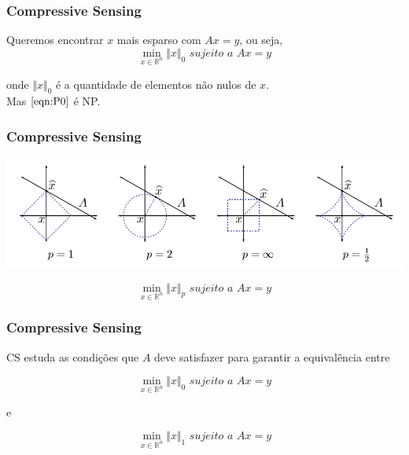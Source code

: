 \documentclass[11pt]{beamer}
\begin{document}
\begin{frame}
\frametitle{Compressive Sensing}
Queremos encontrar $x$ mais esparso com $Ax = y$, ou seja,
\begin{equation}
\min_{x \in \mathbb{R}^n} \Vert x \Vert_0 \textit{ sujeito a } Ax = y
\tag{$P_0$}
\label{eqn:P0}
\end{equation}

onde $\Vert x \Vert_0$ é a quantidade de elementos não nulos de $x$. \\

Mas $\eqref{eqn:P0}$ é NP.
\end{frame}

\begin{frame}
\frametitle{Compressive Sensing}
\begin{center}
\includegraphics[scale=.4]{imagens/normas.png}
\end{center}
\begin{equation}
\min_{x \in \mathbb{R}^n} \Vert x \Vert_p \textit{ sujeito a } Ax = y
\tag{$P_p$}
\label{eqn:Pp}
\end{equation}
\end{frame}

\begin{frame}
\frametitle{Compressive Sensing}
CS estuda as condições que $A$ deve satisfazer para garantir a equivalência entre

\begin{equation}
\min_{x \in \mathbb{R}^n} \Vert x \Vert_0 \textit{ sujeito a } Ax = y
\tag{$P_0$}
\end{equation}

e

\begin{equation}
\min_{x \in \mathbb{R}^n} \Vert x \Vert_1 \textit{ sujeito a } Ax = y
\tag{$P_1$}
\label{eqn:P1}
\end{equation}
\end{frame}
\end{document}
